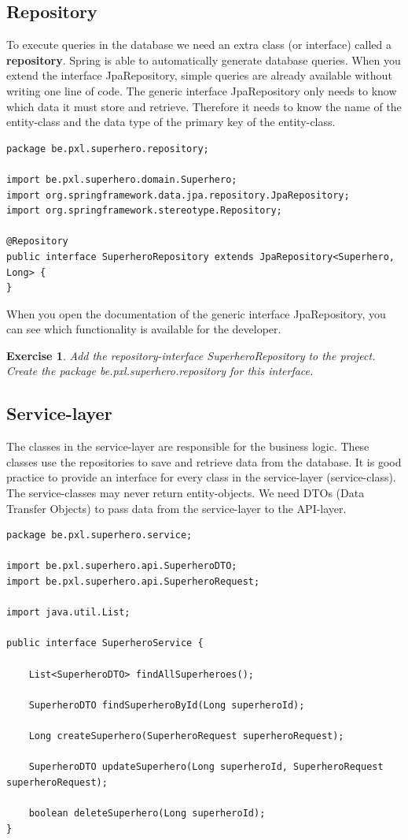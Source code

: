 \documentclass[a4paper, 12pt]{report}
\newenvironment{boxexercise}
{\begin{tcolorbox}
[enhanced jigsaw,breakable,pad at break*=1mm,
 colback=tsyellow!20,boxrule=0pt,frame hidden]}
{\end{tcolorbox}}
\newtheorem{envoefening}{\textbf{Exercise}}[chapter]
\newenvironment{oefening}
               {\begin{boxexercise}\begin{envoefening}}
               {\end{envoefening}\end{boxexercise}}
\begin{document}
\subsection{Repository}

To execute queries in the database we need an extra class (or interface) called a \textbf{repository}. Spring is able to automatically generate database queries. When you extend the interface JpaRepository, simple queries are already available without writing one line of code. 
The generic interface JpaRepository only needs to know which data it must store and retrieve.
Therefore it needs to know the name of the entity-class and the data type of the primary key of the entity-class. 

\begin{lstlisting}[frame=single]
package be.pxl.superhero.repository;

import be.pxl.superhero.domain.Superhero;
import org.springframework.data.jpa.repository.JpaRepository;
import org.springframework.stereotype.Repository;

@Repository
public interface SuperheroRepository extends JpaRepository<Superhero, Long> {
}
\end{lstlisting}

When you open the documentation of the generic interface JpaRepository, you can see which functionality is available for the developer.

\begin{oefening}
Add the repository-interface SuperheroRepository to the project.  Create the package  \textit{be.pxl.superhero.repository} for this interface.
\end{oefening}

\subsection{Service-layer}

The classes in the service-layer are responsible for the business logic. These classes use the repositories to save and retrieve data from the database.  It is good practice to provide an interface for every class in the service-layer (service-class). 
The service-classes may never return entity-objects. We need DTOs (Data Transfer Objects) to pass data from the service-layer to the API-layer.

\begin{lstlisting}[frame=single]
package be.pxl.superhero.service;

import be.pxl.superhero.api.SuperheroDTO;
import be.pxl.superhero.api.SuperheroRequest;

import java.util.List;

public interface SuperheroService {

	List<SuperheroDTO> findAllSuperheroes();

	SuperheroDTO findSuperheroById(Long superheroId);

	Long createSuperhero(SuperheroRequest superheroRequest);

	SuperheroDTO updateSuperhero(Long superheroId, SuperheroRequest superheroRequest);

	boolean deleteSuperhero(Long superheroId);
}
\end{lstlisting}
\end{document}
